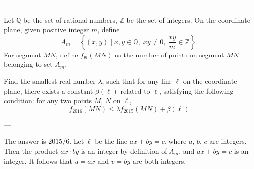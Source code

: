 
---

Let $\mathbb Q$ be the set of rational numbers, $\mathbb Z$ be the set of integers. On the coordinate plane, given positive integer $m$, define \[A_m=\left\{(x,y)\mid x,y\in\mathbb{Q},\;xy\ne0,\;\frac{xy}{m}\in\mathbb Z\right\}.\]
For segment $MN$, define $f_m(MN)$ as the number of points on segment $MN$ belonging to set $A_m$.

Find the smallest real number $\lambda$, such that for any line $\ell$ on the coordinate plane, there exists a constant $\beta(\ell)$ related to $\ell$, satisfying the following condition: for any two points $M$, $N$ on $\ell$, \[f_{2016}(MN)\le\lambda f_{2015}(MN)+\beta(\ell)\]

---

The answer is $2015/6$. Let $\ell$ be the line $ax+by=c$, where $a$, $b$, $c$ are integers. Then the product $ax\cdot by$ is an integer by definition of $A_m$, and $ax+by=c$ is an integer. It follows that $u=ax$ and $v=by$ are both integers.

